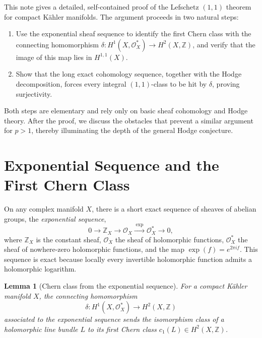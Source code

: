 \documentclass[12pt]{article}
\theoremstyle{plain}
\newtheorem{lemma}[theorem]{Lemma}
\theoremstyle{definition}
\begin{document}
This note gives a detailed, self-contained proof of the Lefschetz $(1,1)$ theorem for compact K\"ahler manifolds.
The argument proceeds in two natural steps:
\begin{enumerate}
    \item Use the exponential sheaf sequence to identify the first Chern class with the connecting homomorphism $\delta: H^1(X,\mathcal O_X^*) \to H^2(X,\mathbb Z)$, and verify that the image of this map lies in $H^{1,1}(X)$.
    \item Show that the long exact cohomology sequence, together with the Hodge decomposition, forces every integral $(1,1)$-class to be hit by $\delta$, proving surjectivity.
\end{enumerate}
Both steps are elementary and rely only on basic sheaf cohomology and Hodge theory.
After the proof, we discuss the obstacles that prevent a similar argument for $p>1$, thereby illuminating the depth of the general Hodge conjecture.

\section{Exponential Sequence and the First Chern Class}

On any complex manifold $X$, there is a short exact sequence of sheaves of abelian groups, the \emph{exponential sequence},
\[
0 \longrightarrow \mathbb Z_X \longrightarrow \mathcal O_X \xrightarrow{\;\exp\;} \mathcal O_X^* \longrightarrow 0,
\]
where $\mathbb Z_X$ is the constant sheaf, $\mathcal O_X$ the sheaf of holomorphic functions, $\mathcal O_X^*$ the sheaf of nowhere‑zero holomorphic functions, and the map $\exp(f) = e^{2\pi i f}$.
This sequence is exact because locally every invertible holomorphic function admits a holomorphic logarithm.

\begin{lemma}[Chern class from the exponential sequence]\label{lem:exp-c1}
For a compact K\"ahler manifold $X$, the connecting homomorphism
\[
\delta: H^1(X,\mathcal O_X^*) \longrightarrow H^2(X,\mathbb Z)
\]
associated to the exponential sequence sends the isomorphism class of a holomorphic line bundle $L$ to its first Chern class $c_1(L) \in H^2(X,\mathbb Z)$.
\end{lemma}
\end{document}
